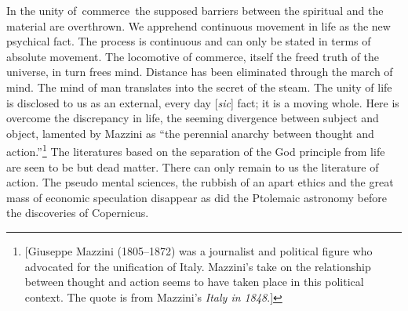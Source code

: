 \documentclass[openany,nobib]{tufte-book}
\begin{document}
In the unity of~commerce~the supposed barriers between the spiritual and
the material are overthrown. We apprehend continuous movement in life as
the new psychical fact. The process is continuous and can only be stated
in terms of absolute movement. The locomotive of commerce, itself the
freed truth of the universe, in turn frees mind. Distance has been
eliminated through the march of mind. The mind of man translates into
the secret of the steam. The unity of life is disclosed to us as an
external, every day {[}\emph{sic}{]} fact; it is a moving whole. Here is
overcome the discrepancy in life, the seeming divergence between subject
and object, lamented by Mazzini as ``the perennial anarchy between
thought and action.''\footnote{{[}Giuseppe Mazzini (1805--1872) was a
  journalist and political figure who advocated for the unification of
  Italy. Mazzini's take on the relationship between thought and action
  seems to have taken place in this political context. The quote is from
  Mazzini's \emph{Italy in 1848}.{]}

  \hfill\break
} The literatures based on the separation of the God principle from life
are seen to be but dead matter. There can only remain to us the
literature of action. The pseudo mental sciences, the rubbish of an
apart ethics and the great mass of economic speculation disappear as did
the Ptolemaic astronomy before the discoveries of Copernicus.~~
\end{document}
